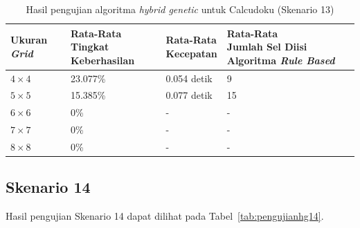\begin{table}
\centering
\captionsetup{justification=centering}
\caption[Hasil pengujian algoritma \textit{hybrid genetic} untuk Calcudoku (Skenario 13)]{Hasil pengujian algoritma \textit{hybrid genetic} untuk Calcudoku (Skenario 13)}
\begin{tabular}{| l | l | l | l |}
\hline
Ukuran \textit{Grid} & \makecell[l]{Rata-Rata \\ Tingkat Keberhasilan} & \makecell[l]{Rata-Rata \\ Kecepatan} & \makecell[l]{Rata-Rata \\ Jumlah Sel Diisi Algoritma \textit{Rule Based}} \\
\hline \hline
\begin{math}4 \times 4\end{math} & 23.077\% & 0.054 detik & 9 \\
\hline
\begin{math}5 \times 5\end{math} & 15.385\% & 0.077 detik & 15 \\
\hline
\begin{math}6 \times 6\end{math} & 0\% & - & - \\
\hline
\begin{math}7 \times 7\end{math} & 0\% & - & - \\
\hline
\begin{math}8 \times 8\end{math} & 0\% & - & - \\
\hline
\end{tabular}
\label{tab:pengujianhg13}
\end{table}

\clearpage

\subsection{Skenario 14}
\label{sec:skenario14}

Hasil pengujian Skenario 14 dapat dilihat pada Tabel~\ref{tab:pengujianhg14}.

